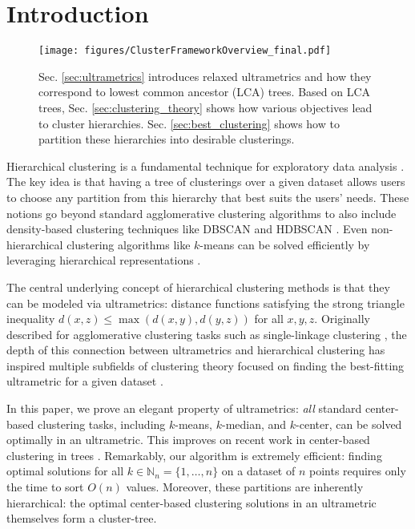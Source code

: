 \section{Introduction}


\begin{figure*}[t!]
    \centering
    \texttt{[image: figures/ClusterFrameworkOverview\_final.pdf]}
    \caption{Sec. \ref{sec:ultrametrics} introduces relaxed ultrametrics and how they correspond to lowest common ancestor (LCA) trees. Based on LCA trees, Sec. \ref{sec:clustering_theory} shows how various objectives lead to cluster hierarchies. Sec. \ref{sec:best_clustering} shows how to partition these hierarchies into desirable clusterings.
    }
    \label{fig:overview}
\end{figure*}


Hierarchical clustering is a fundamental technique for exploratory data analysis \citep{hierarchical_clustering_og, hierarchical_clustering_og_2}.
The key idea is that having a tree of clusterings over a given dataset allows users to choose any partition from this hierarchy that best suits the users' needs. These notions go beyond standard agglomerative clustering algorithms to also include density-based clustering techniques like DBSCAN \cite{dbscan} and HDBSCAN \cite{hdbscan}. Even non-hierarchical clustering algorithms like $k$-means can be solved efficiently by leveraging hierarchical representations \cite{mettu_plaxton, fast_kmeans, hierarchical_kmedian}.

The central underlying concept of hierarchical clustering methods is that they can be modeled via ultrametrics: distance functions satisfying the strong triangle inequality $d(x, z) \leq \max(d(x, y), d(y, z))$ for all $x, y, z$.
Originally described for agglomerative clustering tasks such as single-linkage clustering \cite{ultrametric_single_linkage}, the depth of this connection between ultrametrics and hierarchical clustering has inspired multiple subfields of clustering theory focused on finding the best-fitting ultrametric for a given dataset \cite{hst_1, hst_3, dasgupta_objective, HC_objectives, ultrametric_grad_descent}.

In this paper, we prove an elegant property of ultrametrics: \emph{all} standard center-based clustering tasks, including $k$-means, $k$-median, and $k$-center, can be solved optimally in an ultrametric. This improves on recent work in center-based clustering in trees \citep{hierarchical_kmedian, beer2023connecting, cover_tree_k_means}. Remarkably, our algorithm is extremely efficient: finding optimal solutions for all $k \in \mathbb{N}_n = \{1, \ldots, n\}$ on a dataset of 
$n$ points requires only the time to sort $O(n)$ values. %
Moreover, these partitions are inherently hierarchical: the optimal center-based clustering solutions in an ultrametric themselves form a cluster-tree.

